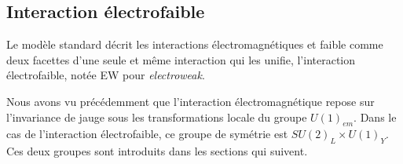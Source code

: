 \subsection{Interaction électrofaible}\label{chapter-MS-MSSM-section-formalisme-subsec-EW}
Le modèle standard décrit les interactions électromagnétiques et faible comme deux facettes d'une seule et même interaction qui les unifie, l'interaction électrofaible, notée \og EW \fg{} pour \emph{electroweak}.
\par Nous avons vu précédemment que l'interaction électromagnétique repose sur l'invariance de jauge sous les transformations locale du groupe $U(1)_{em}$.
Dans le cas de l'interaction électrofaible, ce groupe de symétrie est $SU(2)_L \times U(1)_Y$. Ces deux groupes sont introduits dans les sections qui suivent.

